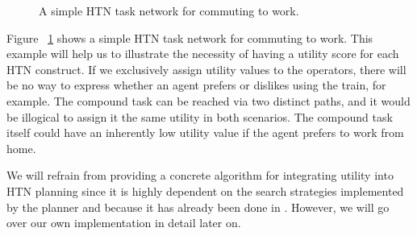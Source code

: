 \begin{figure}[H]
    \centering
    \caption{A simple HTN task network for commuting to work.}
    \label{fig:commute_to_work}
\end{figure}
Figure ~\ref{fig:commute_to_work} shows a simple HTN task network for commuting to work. This example will help us to illustrate the necessity of having a utility score for each HTN construct. If we exclusively assign utility values to the operators, there will be no way to express whether an agent prefers or dislikes using the train, for example. The compound task  can be reached via two distinct paths, and it would be illogical to assign it the same utility in both scenarios. The compound task  itself could have an inherently low utility value if the agent prefers to work from home.

We will refrain from providing a concrete algorithm for integrating utility into HTN planning since it is highly dependent on the search strategies implemented by the planner and because it has already been done in \cite{alnazer2019htn} \cite{georgievski2014utility} \cite{alnazer2022risk}. However, we will go over our own implementation in detail later on.

